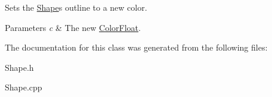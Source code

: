 Sets the \hyperlink{classtsgl_1_1_shape}{Shape}\textquotesingle{}s outline to a new color. 


\begin{DoxyParams}{Parameters}
{\em c} & The new \hyperlink{structtsgl_1_1_color_float}{Color\+Float}. \\
\hline
\end{DoxyParams}


The documentation for this class was generated from the following files\+:\begin{DoxyCompactItemize}
\item 
Shape.\+h\item 
Shape.\+cpp\end{DoxyCompactItemize}
